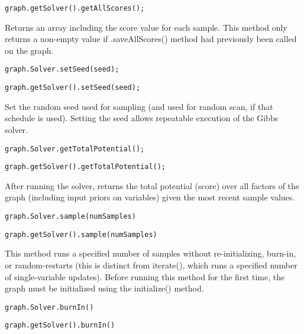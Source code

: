\ifjava
\begin{lstlisting}
graph.getSolver().getAllScores();
\end{lstlisting}
\fi

Returns an array including the score value for each sample. This method only returns a non-empty value if .saveAllScores() method had previously been called on the graph.

\ifmatlab
\begin{lstlisting}
graph.Solver.setSeed(seed);
\end{lstlisting}
\fi

\ifjava
\begin{lstlisting}
graph.getSolver().setSeed(seed);
\end{lstlisting}
\fi

Set the random seed used for sampling (and used for random scan, if that schedule is used). Setting the seed allows repeatable execution of the Gibbs solver.

\ifmatlab
\begin{lstlisting}
graph.Solver.getTotalPotential();
\end{lstlisting}
\fi

\ifjava
\begin{lstlisting}
graph.getSolver().getTotalPotential();
\end{lstlisting}
\fi

After running the solver, returns the total potential (score) over all factors of the graph (including input priors on variables) given the most recent sample values.

\ifmatlab
\begin{lstlisting}
graph.Solver.sample(numSamples)
\end{lstlisting}
\fi

\ifjava
\begin{lstlisting}
graph.getSolver().sample(numSamples)
\end{lstlisting}
\fi

This method runs a specified number of samples without re-initializing, burn-in, or random-restarts (this is distinct from iterate(), which runs a specified number of single-variable updates).  Before running this method for the first time, the graph must be initialized using the initialize() method.

\ifmatlab
\begin{lstlisting}
graph.Solver.burnIn()
\end{lstlisting}
\fi

\ifjava
\begin{lstlisting}
graph.getSolver().burnIn()
\end{lstlisting}
\fi

